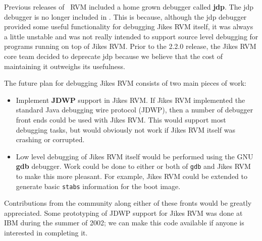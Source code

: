 Previous releases of \JikesTM\ RVM included a home grown
debugger called {\bf jdp}.  The jdp debugger is no longer included in
\jrvm{}.  This is because, although the jdp debugger provided some
useful functionality for debugging Jikes RVM itself, it was always a
little unstable and was not really intended to support source level
debugging for programs running on top of Jikes RVM.  Prior to the
2.2.0 release, the Jikes RVM core team decided to deprecate jdp
because we believe that the cost of maintaining it outweighs its
usefulness.


The future plan for debugging Jikes RVM consists of two main pieces of
work:

\begin{itemize}
\item Implement {\bf JDWP} support in Jikes RVM. If Jikes RVM
implemented the standard Java debugging wire protocol (JDWP), then a
number of debugger front ends could be used with Jikes RVM.  This
would support most debugging tasks, but would obviously not work if
Jikes RVM itself was crashing or corrupted.

\item Low level debugging of Jikes RVM itself would be performed using
the GNU {\bf gdb} debugger.  Work could be done to either or both of
{\tt gdb} and Jikes RVM to make this more pleasant.  For example,
Jikes RVM could be extended to generate basic {\tt stabs} information
for the boot image.
\end{itemize}

Contributions from the community along either of these fronts would be
greatly appreciated.  Some prototyping of JDWP support for Jikes RVM
was done at IBM during the summer of 2002; we can make this code
available if anyone is interested in completing it.


